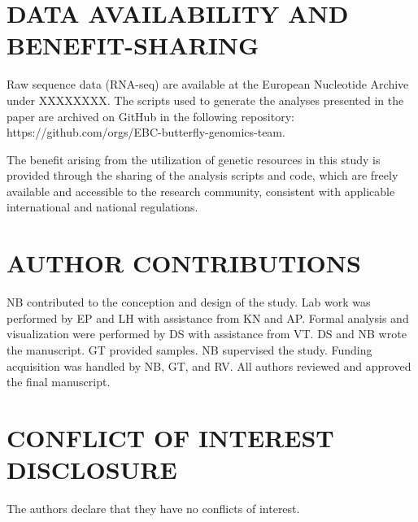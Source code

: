 \documentclass[lineno]{wiley-article}
\begin{document}
\section*{DATA AVAILABILITY AND BENEFIT-SHARING}
Raw sequence data (RNA-seq) are available at the European Nucleotide Archive under XXXXXXXX. The scripts used to generate the analyses presented in the paper are archived on GitHub in the following repository: \\
https://github.com/orgs/EBC-butterfly-genomics-team.

The benefit arising from the utilization of genetic resources in this study is provided through the sharing of the analysis scripts and code, which are freely available and accessible to the research community, consistent with applicable international and national regulations.

\section*{AUTHOR CONTRIBUTIONS}
NB contributed to the conception and design of the study. Lab work was performed by EP and LH with assistance from KN and AP. Formal analysis and visualization were performed by DS with assistance from VT. DS and NB wrote the manuscript. GT provided samples. NB supervised the study. Funding acquisition was handled by NB, GT, and RV. All authors reviewed and approved the final manuscript.

\section*{CONFLICT OF INTEREST DISCLOSURE}
The authors declare that they have no conflicts of interest.







\end{document}
